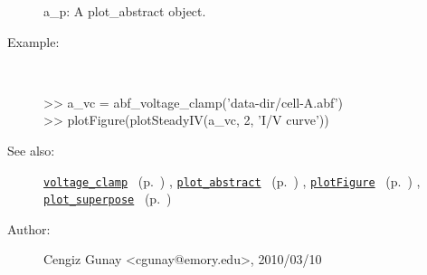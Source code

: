 \begin{description}
   a\_p: A plot\_abstract object.
%
\item[Example:]~
\begin{lyxcode} >> a\_vc = abf\_voltage\_clamp('data-dir/cell-A.abf')
\\%
 >> plotFigure(plotSteadyIV(a\_vc, 2, 'I/V curve'))
\\%
\end{lyxcode}
%
\item[See also:]%
\hyperlink{ref_voltage_clamp}{\texttt{voltage\_clamp}}%
\ (p.~\pageref{ref_voltage_clamp})%
%
, \hyperlink{ref_plot_abstract}{\texttt{plot\_abstract}}%
\ (p.~\pageref{ref_plot_abstract})%
%
, \hyperlink{ref_plotFigure}{\texttt{plotFigure}}%
\ (p.~\pageref{ref_plotFigure})%
%
, \hyperlink{ref_plot_superpose}{\texttt{plot\_superpose}}%
\ (p.~\pageref{ref_plot_superpose})%
%
%
\item[Author:]%
Cengiz Gunay <cgunay@emory.edu>, 2010/03/10
%
\end{description}
\methodline%
